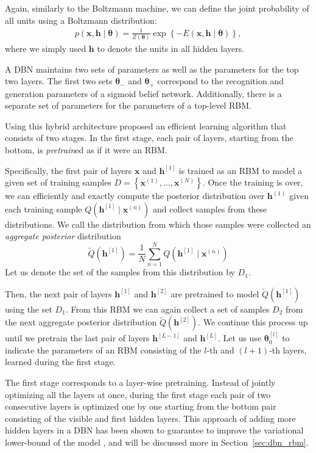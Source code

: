 \documentclass{now}
\newcommand{\qlay}[1]{\left[#1\right]}
\newcommand{\vect}[1]{\mathbf{#1}}
\newcommand{\vects}[1]{\boldsymbol{#1}}
\newcommand{\vh}[0]{\vect{h}}
\newcommand{\vx}[0]{\vect{x}}
\newcommand{\TT}[0]{{\vects{\theta}}}
\begin{document}
Again, similarly to the Boltzmann machine, we can define the
joint probability of all units using a Boltzmann
distribution:
\begin{align*}
    p(\vx, \vh \mid \TT) = \frac{1}{Z(\TT)} \exp \left\{
    -E(\vx, \vh \mid \TT)
    \right\},
\end{align*}
where we simply used $\vh$ to denote the units in all hidden
layers.

A DBN maintains two sets of parameters as well as the
parameters for the top two layers.  The first two sets
$\TT_-$ and $\TT_+$ correspond to the recognition and
generation parameters of a sigmoid belief network.
Additionally, there is a separate set of parameters for the
parameters of a top-level RBM.

Using this hybrid architecture \citet{Hinton2006nc} proposed
an efficient learning algorithm that consists of two stages.
In the first stage, each pair of layers, starting from the
bottom, is \textit{pretrain}ed as if it were an RBM.

Specifically, the first pair of layers $\vx$ and
$\vh^{\qlay{1}}$
is trained as an RBM to model a given set of training
samples $D=\left\{ \vx^{(1)}, \dots, \vx^{(N)} \right\}$.
Once the training is over, we can efficiently and exactly
compute the posterior distribution over $\vh^{(1)}$ given
each training sample $Q(\vh^{\qlay{1}} \mid \vx^{(n)})$ and
collect samples from these distributions. We call the
distribution from which those samples were collected an
\textit{aggregate posterior} distribution
\[
\tilde{Q}\left( \vh^{\qlay{1}} \right) = \frac{1}{N}
\sum_{n=1}^N Q\left(\vh^{\qlay{1}} \mid \vx^{(n)}\right)
\]
Let us denote the set of the samples from this distribution by $D_1$. 

Then, the next pair of layers $\vh^{\qlay{1}}$ and
$\vh^{\qlay{2}}$ are pretrained to model $\tilde{Q}\left(
\vh^{\qlay{1}} \right)$ using the set $D_1$. From this RBM
we can again collect a set of samples $D_2$ from the next
aggregate posterior distribution $\tilde{Q}\left(
\vh^{\qlay{2}} \right)$. We continue this process up until
we pretrain the last pair of layers $\vh^{\qlay{L-1}}$ and
$\vh^{\qlay{L}}$. Let us use $\TT_0^{\qlay{l}}$ to indicate the
parameters of an RBM consisting of the $l$-th and $(l+1)$-th
layers, learned during the first stage.

The first stage corresponds to a layer-wise pretraining.
Instead of jointly optimizing all the layers at once, during
the first stage each pair of two consecutive layers is
optimized one by one starting from the bottom pair
consisting of the visible and first hidden layers. This
approach of adding more hidden layers in a DBN has been
shown to guarantee to improve the variational lower-bound of
the model \citep{Hinton2006nc}, and will be discussed more
in Section~\ref{sec:dbn_rbm}.
\end{document}
